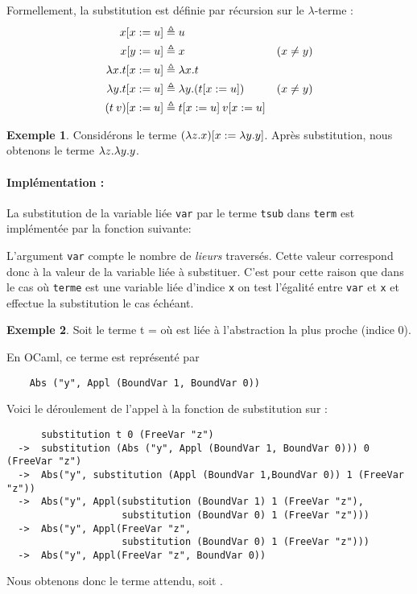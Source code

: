 \documentclass {article}
\newcommand{\codefrom}[3]
           {}
\theoremstyle{definition}
\newtheorem{example}{Exemple}
\theoremstyle{remark}
\newcommand{\fun}[1]{\lstinline!#1!}
\begin{document}
Formellement, la substitution est définie par récursion sur le $\lambda$-terme : 
\begin{align*}
    x[x := u] &\triangleq u \\
    x[y := u] &\triangleq x & (x \neq y)\\
    \lambda x.t[x := u] &\triangleq \lambda x.t \\
    \lambda y.t[x := u] &\triangleq \lambda y. (t[x := u]) & (x \neq y)\\
    (t\: v)[x := u] &\triangleq t[x := u]\: v[x := u]
\end{align*}

\begin{example}
  Considérons le terme $(\lambda z. x)[x := \lambda y. y]$. Après substitution, nous obtenons le terme $\lambda z. \lambda y. y$.
\end{example}


\paragraph{Implémentation :} 
La substitution de la variable liée \lstinline!var! par le terme
\lstinline!tsub! dans \lstinline!term! est implémentée par la fonction suivante:
%
\codefrom{untyped}{lambda}{substitution}

L'argument \fun{var} compte le nombre de \emph{lieurs} traversés.
Cette valeur correspond donc à la valeur de la variable liée à substituer. C'est pour cette
raison que dans le cas où \fun{terme} est une variable liée d'indice \fun{x} on test l'égalité entre 
\fun{var} et \fun{x} et effectue la substitution le cas échéant.


\begin{example}
  Soit le terme t =  où  est liée à
  l'abstraction la plus proche (indice 0).

  En OCaml, ce terme est représenté par 
  \begin{lstlisting}
    Abs ("y", Appl (BoundVar 1, BoundVar 0))
  \end{lstlisting}

  Voici le déroulement de l'appel à la fonction de substitution sur  :
  \begin{lstlisting}
      substitution t 0 (FreeVar "z")
  ->  substitution (Abs ("y", Appl (BoundVar 1, BoundVar 0))) 0 (FreeVar "z")
  ->  Abs("y", substitution (Appl (BoundVar 1,BoundVar 0)) 1 (FreeVar "z"))
  ->  Abs("y", Appl(substitution (BoundVar 1) 1 (FreeVar "z"), 
                    substitution (BoundVar 0) 1 (FreeVar "z")))
  ->  Abs("y", Appl(FreeVar "z", 
                    substitution (BoundVar 0) 1 (FreeVar "z")))
  ->  Abs("y", Appl(FreeVar "z", BoundVar 0))
  \end{lstlisting}

  Nous obtenons donc le terme attendu, soit .
\end{example}
\end{document}
